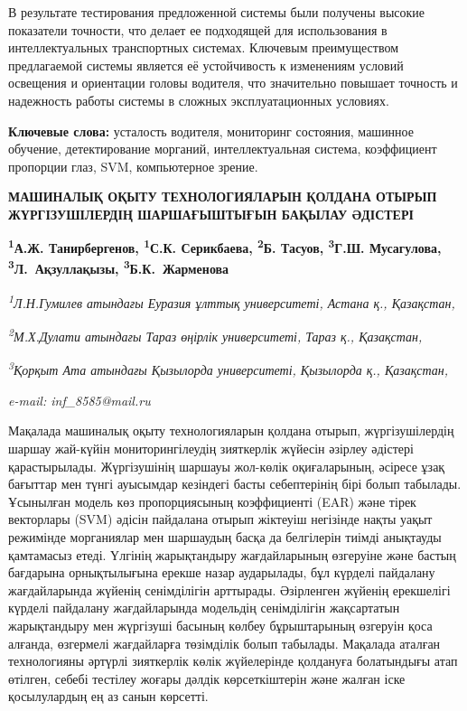 В результате тестирования предложенной системы были получены высокие
показатели точности, что делает ее подходящей для использования в
интеллектуальных транспортных системах. Ключевым преимуществом
предлагаемой системы является её устойчивость к изменениям условий
освещения и ориентации головы водителя, что значительно повышает
точность и надежность работы системы в сложных эксплуатационных
условиях.

{\bfseries Ключевые слова:} усталость водителя, мониторинг состояния,
машинное обучение, детектирование морганий, интеллектуальная система,
коэффициент пропорции глаз, SVM, компьютерное зрение.

\begin{articleheader}
{\bfseries МАШИНАЛЫҚ ОҚЫТУ ТЕХНОЛОГИЯЛАРЫН ҚОЛДАНА ОТЫРЫП ЖҮРГІЗУШІЛЕРДІҢ
ШАРШАҒЫШТЫҒЫН БАҚЫЛАУ ӘДІСТЕРІ}

{\bfseries
\textsuperscript{1}А.Ж. Танирбергенов,
\textsuperscript{1}С.К. Серикбаева\textsuperscript{\envelope },
\textsuperscript{2}Б. Тасуов,
\textsuperscript{3}Г.Ш. Мусагулова,
\textsuperscript{3}Л.~Ақзуллақызы,
\textsuperscript{3}Б.К.~Жарменова}
\end{articleheader}

\begin{affiliation}
\emph{\textsuperscript{1}Л.Н.Гумилев атындағы Еуразия ұлттық университеті, Астана қ., Қазақстан,}

\emph{\textsuperscript{2}М.Х.Дулати атындағы Тараз өңірлік университеті, Тараз қ., Қазақстан,}

\emph{\textsuperscript{3}Қорқыт Ата атындағы Қызылорда университеті, Қызылорда қ., Қазақстан,}

\emph{e-mail: inf\_8585@mail.ru}
\end{affiliation}

Мақалада машиналық оқыту технологияларын қолдана отырып, жүргізушілердің
шаршау жай-күйін мониторингілеудің зияткерлік жүйесін әзірлеу әдістері
қарастырылады. Жүргізушінің шаршауы жол-көлік оқиғаларының, әсіресе ұзақ
бағыттар мен түнгі ауысымдар кезіндегі басты себептерінің бірі болып
табылады. Ұсынылған модель көз пропорциясының коэффициенті (EAR) және
тірек векторлары (SVM) әдісін пайдалана отырып жіктеуіш негізінде нақты
уақыт режимінде морганиялар мен шаршаудың басқа да белгілерін тиімді
анықтауды қамтамасыз етеді. Үлгінің жарықтандыру жағдайларының өзгеруіне
және бастың бағдарына орнықтылығына ерекше назар аударылады, бұл күрделі
пайдалану жағдайларында жүйенің сенімділігін арттырады. Әзірленген
жүйенің ерекшелігі күрделі пайдалану жағдайларында модельдің
сенімділігін жақсартатын жарықтандыру мен жүргізуші басының көлбеу
бұрыштарының өзгеруін қоса алғанда, өзгермелі жағдайларға төзімділік
болып табылады. Мақалада аталған технологияны әртүрлі зияткерлік көлік
жүйелерінде қолдануға болатындығы атап өтілген, себебі тестілеу жоғары
дәлдік көрсеткіштерін және жалған іске қосылулардың ең аз санын
көрсетті.

